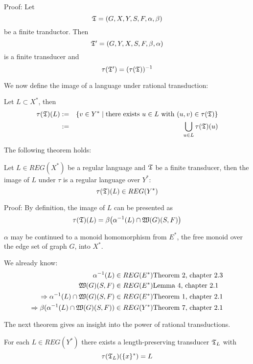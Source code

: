 Proof: Let \[ \mbox{$\mathfrak{T}$} = (G, X, Y, S, F, \alpha, \beta) \] be a finite tranductor.
Then \[ \mbox{$\mathfrak{T'}$} = (G, Y, X, S, F, \beta, \alpha) \] is a finite transducer and
\[ \tau(\mbox{$\mathfrak{T'}$}) = (\tau(\mbox{$\mathfrak{T}$}))^{-1} \]

We now define the image of a language under rational transduction:

\begin{definition}
Let $L \subset X^*$, then
\begin{eqnarray*}
\tau(\mbox{$\mathfrak{T}$})(L) & := & \{ v \in Y^* \mid \mbox{there exists } u \in L \mbox{
with } (u, v) \in \tau(\mbox{$\mathfrak{T}$}) \} \\
& := & \bigcup_{u \in L} \tau(\mbox{$\mathfrak{T}$})(u)
\end{eqnarray*}
\end{definition}

The following theorem holds:

\begin{theorem}
Let $L \in REG(X^*)$ be a regular language and $\mbox{$\mathfrak{T}$}$ be a finite transducer,
then the image of $L$ under $\tau$ is a regular language over $Y^*$:
\[ \tau(\mbox{$\mathfrak{T}$})(L) \in REG(Y^*) \]
\end{theorem}

Proof: By definition, the image of $L$ can be presented as
\[ \tau(\mbox{$\mathfrak{T}$})(L) = \beta\big( \alpha^{-1}(L) \cap \mbox{$\mathfrak{W}(G)$}(S, F) \big) \]

$\alpha$ may be continued to a monoid homomorphism from $E^*$, the free monoid
over the edge set of graph $G$, into $X^*$.

We already know:
\begin{eqnarray*}
\alpha^{-1}(L) \in REG(E^*)    & \mbox{Theorem 2, chapter 2.3} \\
\mbox{$\mathfrak{W}(G)$}(S, F) \in REG(E^*) & \mbox{Lemma 4, chapter 2.1} \\
\Rightarrow \alpha^{-1}(L) \cap \mbox{$\mathfrak{W}(G)$}(S, F) \in
REG(E^*) & \mbox{Theorem 1, chapter 2.1} \\
\Rightarrow \beta(\alpha^{-1}(L) \cap \mbox{$\mathfrak{W}(G)$}(S, F)) \in
REG(Y^*) & \mbox{Theorem 7, chapter 2.1}
\end{eqnarray*}

The next theorem gives an insight into the power of rational transductions.

\begin{theorem}
For each $L \in REG(Y^*)$ there exists a length-preserving transducer
$\mbox{$\mathfrak{T}$}_L$ with \[ \tau(\mbox{$\mathfrak{T}$}_L)(\{x\}^*) = L \]
\end{theorem}

